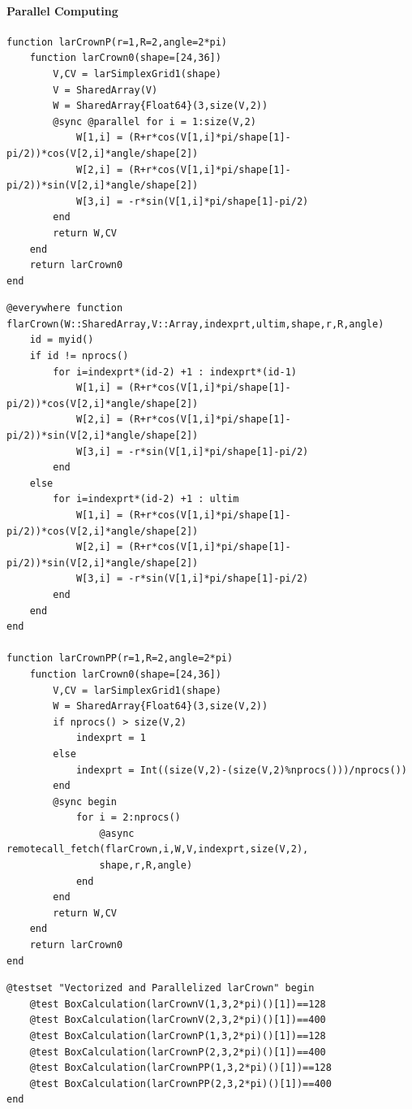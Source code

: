 \documentclass{article}
\begin{document}
\paragraph{Parallel Computing}
\begin{Verbatim}
function larCrownP(r=1,R=2,angle=2*pi)          
    function larCrown0(shape=[24,36])
        V,CV = larSimplexGrid1(shape)
        V = SharedArray(V)
        W = SharedArray{Float64}(3,size(V,2))           
        @sync @parallel for i = 1:size(V,2)
            W[1,i] = (R+r*cos(V[1,i]*pi/shape[1]-pi/2))*cos(V[2,i]*angle/shape[2])           
            W[2,i] = (R+r*cos(V[1,i]*pi/shape[1]-pi/2))*sin(V[2,i]*angle/shape[2])
            W[3,i] = -r*sin(V[1,i]*pi/shape[1]-pi/2)
        end
        return W,CV
    end
    return larCrown0    
end
\end{Verbatim}

\begin{Verbatim}
@everywhere function flarCrown(W::SharedArray,V::Array,indexprt,ultim,shape,r,R,angle)
    id = myid()
    if id != nprocs()
        for i=indexprt*(id-2) +1 : indexprt*(id-1)
            W[1,i] = (R+r*cos(V[1,i]*pi/shape[1]-pi/2))*cos(V[2,i]*angle/shape[2])           
            W[2,i] = (R+r*cos(V[1,i]*pi/shape[1]-pi/2))*sin(V[2,i]*angle/shape[2])
            W[3,i] = -r*sin(V[1,i]*pi/shape[1]-pi/2)
        end
    else
        for i=indexprt*(id-2) +1 : ultim
            W[1,i] = (R+r*cos(V[1,i]*pi/shape[1]-pi/2))*cos(V[2,i]*angle/shape[2])           
            W[2,i] = (R+r*cos(V[1,i]*pi/shape[1]-pi/2))*sin(V[2,i]*angle/shape[2])
            W[3,i] = -r*sin(V[1,i]*pi/shape[1]-pi/2)
        end
    end
end

function larCrownPP(r=1,R=2,angle=2*pi)          
    function larCrown0(shape=[24,36])
        V,CV = larSimplexGrid1(shape)
        W = SharedArray{Float64}(3,size(V,2))           
        if nprocs() > size(V,2)
            indexprt = 1
        else
            indexprt = Int((size(V,2)-(size(V,2)%nprocs()))/nprocs())
        end
        @sync begin
            for i = 2:nprocs()
                @async remotecall_fetch(flarCrown,i,W,V,indexprt,size(V,2),
                shape,r,R,angle)
            end
        end
        return W,CV
    end
    return larCrown0    
end
\end{Verbatim}

\begin{Verbatim}
@testset "Vectorized and Parallelized larCrown" begin
    @test BoxCalculation(larCrownV(1,3,2*pi)()[1])==128
    @test BoxCalculation(larCrownV(2,3,2*pi)()[1])==400
    @test BoxCalculation(larCrownP(1,3,2*pi)()[1])==128
    @test BoxCalculation(larCrownP(2,3,2*pi)()[1])==400
    @test BoxCalculation(larCrownPP(1,3,2*pi)()[1])==128
    @test BoxCalculation(larCrownPP(2,3,2*pi)()[1])==400
end
\end{Verbatim}
\end{document}
